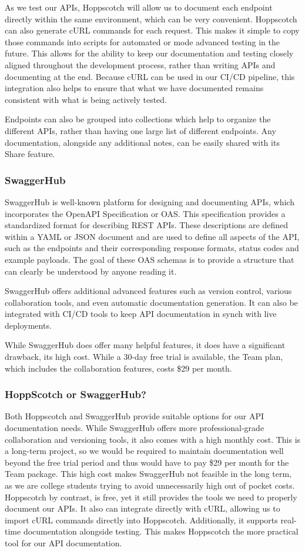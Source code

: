 \documentclass[12pt]{article}
\begin{document}
As we test our APIs, Hoppscotch will allow us to document each endpoint directly within the same environment, which can be very convenient. Hoppscotch can also generate cURL commands for each request. This makes it simple to copy those commands into scripts for automated or mode advanced testing in the future. This allows for the ability to keep our documentation and testing closely aligned throughout the development process, rather than writing APIs and documenting at the end. Because cURL can be used in our CI/CD pipeline, this integration also helps to ensure that what we have documented remains consistent with what is being actively tested.

Endpoints can also be grouped into collections which help to organize the different APIs, rather than having one large list of different endpoints. Any documentation, alongside any additional notes, can be easily shared with its Share feature.
\subsubsection{SwaggerHub}
SwaggerHub is well-known platform for designing and documenting APIs, which incorporates the OpenAPI Specification or OAS. This specification provides a standardized format for describing REST APIs. These descriptions are defined within a YAML or JSON document and are used to define all aspects of the API, such as the endpoints and their corresponding response formats, status codes and example payloads. The goal of these OAS schemas is to provide a structure that can clearly be understood by anyone reading it.

SwaggerHub offers additional advanced features such as version control, various collaboration tools, and even automatic documentation generation. It can also be integrated with CI/CD tools to keep API documentation in synch with live deployments. 

While SwaggerHub does offer many helpful features, it does have a significant drawback, its high cost. While a 30-day free trial is available, the Team plan, which includes the collaboration features, costs \$29 per month.

\subsubsection{HoppScotch or SwaggerHub?}
Both Hoppscotch and SwaggerHub provide suitable options for our API documentation needs. While SwaggerHub offers more professional-grade collaboration and versioning tools, it also comes with a high monthly cost. This is a long-term project, so we would be required to maintain documentation well beyond the free trial period and thus would have to pay \$29 per month for the Team package. This high cost makes SwaggerHub not feasible in the long term, as we are college students trying to avoid unnecessarily high out of pocket costs. Hoppscotch by contrast, is free, yet it still provides the tools we need to properly document our APIs. It also can integrate directly with cURL, allowing us to import cURL commands directly into Hoppscotch. Additionally, it supports real-time documentation alongside testing. This makes Hoppscotch the more practical tool for our API documentation.
\end{document}
